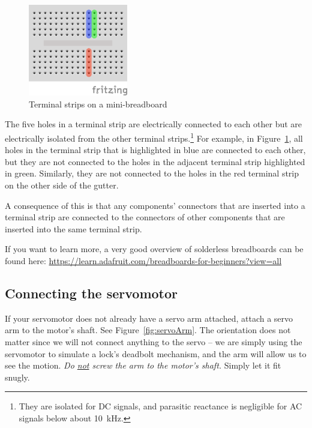 \begin{figure}
    \centering
    \includegraphics[height=4cm]{hardware/breadboard}
    \caption{Terminal strips on a mini-breadboard \label{fig:breadboard-mk4b}}
\end{figure}

The five holes in a terminal strip are electrically connected to each other but are electrically isolated from the other terminal strips.\footnote{
    They are isolated for DC signals, and parasitic reactance is negligible for AC signals below about 10~kHz.
}
For example, in Figure~\ref{fig:breadboard-mk4b}, all holes in the terminal strip that is highlighted in blue are connected to each other,
but they are not connected to the holes in the adjacent terminal strip highlighted in green.
Similarly, they are not connected to the holes in the red terminal strip on the other side of the gutter.

A consequence of this is that any components' connectors that are inserted into a terminal strip are connected to the connectors of other components that are inserted into the same terminal strip.

If you want to learn more, a very good overview of solderless breadboards can be found here: \url{https://learn.adafruit.com/breadboards-for-beginners?view=all}

%


\subsection{Connecting the servomotor}

If your servomotor does not already have a servo arm attached, attach a servo arm to the motor's shaft.
See Figure~\ref{fig:servoArm}.
The orientation does not matter since we will not connect anything to the servo -- we are simply using the servomotor to simulate a lock's deadbolt mechanism,
and the arm will allow us to see the motion.
\textit{Do \underline{not} screw the arm to the motor's shaft.}
Simply let it fit snugly.


